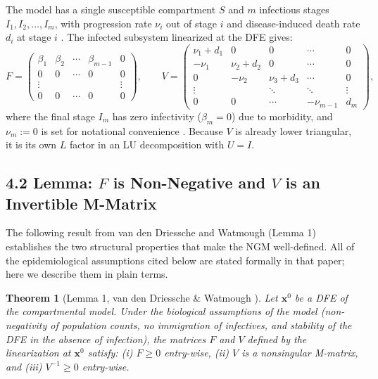 \documentclass[12pt]{article}
\theoremstyle{plain}
\newtheorem{theorem}{Theorem}
\theoremstyle{definition}
\begin{document}
The model has a single susceptible compartment $S$ and $m$ infectious stages
$I_1, I_2, \ldots, I_m$, with progression rate $\nu_i$ out of stage $i$ and
disease-induced death rate $d_i$ at stage $i$ \cite{vddriessche2002}. The infected
subsystem linearized at the DFE gives:
\[
  F = \begin{pmatrix}
    \beta_1 & \beta_2 & \cdots & \beta_{m-1} & 0 \\
    0       & 0       & \cdots & 0           & 0 \\
    \vdots  &         &        &             & \vdots \\
    0       & 0       & \cdots & 0           & 0
  \end{pmatrix},
  \qquad
  V = \begin{pmatrix}
    \nu_1+d_1 & 0         & 0         & \cdots & 0   \\
    -\nu_1    & \nu_2+d_2 & 0         & \cdots & 0   \\
    0         & -\nu_2    & \nu_3+d_3 & \cdots & 0   \\
    \vdots    &           & \ddots    & \ddots & \vdots \\
    0         & 0         & \cdots    & -\nu_{m-1} & d_m
  \end{pmatrix},
\]
where the final stage $I_m$ has zero infectivity ($\beta_m = 0$) due to morbidity, and
$\nu_m := 0$ is set for notational convenience \cite{vddriessche2002}. Because $V$ is
already lower triangular, it is its own $L$ factor in an LU decomposition with $U = I$.

\subsection*{4.2 \quad Lemma: $F$ is Non-Negative and $V$ is an Invertible M-Matrix}

The following result from van den Driessche and Watmough \cite{vddriessche2002} (Lemma 1)
establishes the two structural properties that make the NGM well-defined. All of the
epidemiological assumptions cited below are stated formally in that paper; here we describe
them in plain terms.

\begin{theorem}[Lemma 1, van den Driessche \& Watmough \cite{vddriessche2002}]
Let $\mathbf{x}^0$ be a DFE of the compartmental model. Under the biological assumptions
of the model (non-negativity of population counts, no immigration of infectives, and
stability of the DFE in the absence of infection), the matrices $F$ and $V$ defined by the
linearization at $\mathbf{x}^0$ satisfy: (i) $F \geq 0$ entry-wise, (ii) $V$ is a nonsingular
M-matrix, and (iii) $V^{-1} \geq 0$ entry-wise.
\end{theorem}
\end{document}
